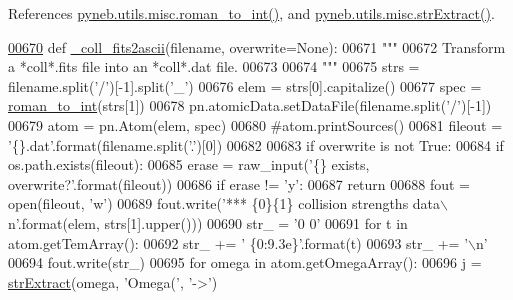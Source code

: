 References \hyperlink{misc_8py_source_l00053}{pyneb.\+utils.\+misc.\+roman\+\_\+to\+\_\+int()}, and \hyperlink{misc_8py_source_l00138}{pyneb.\+utils.\+misc.\+str\+Extract()}.


\begin{DoxyCode}
\hypertarget{namespacepyneb_1_1utils_1_1manage__atomic__data_l00670}{}\hyperlink{namespacepyneb_1_1utils_1_1manage__atomic__data_a1d70a5d8b876f114e058506cd9998de4}{00670} \textcolor{keyword}{def }\hyperlink{namespacepyneb_1_1utils_1_1manage__atomic__data_a1d70a5d8b876f114e058506cd9998de4}{\_coll\_fits2ascii}(filename, overwrite=None):
00671     \textcolor{stringliteral}{"""}
00672 \textcolor{stringliteral}{    Transform a *coll*.fits file into an *coll*.dat file.}
00673 \textcolor{stringliteral}{    }
00674 \textcolor{stringliteral}{    """}
00675     strs = filename.split(\textcolor{stringliteral}{'/'})[-1].split(\textcolor{stringliteral}{'\_'})
00676     elem = strs[0].capitalize()
00677     spec = \hyperlink{namespacepyneb_1_1utils_1_1misc_a97329c3ce57bd870421672b90e3e6541}{roman\_to\_int}(strs[1])
00678     pn.atomicData.setDataFile(filename.split(\textcolor{stringliteral}{'/'})[-1])
00679     atom = pn.Atom(elem, spec)
00680     \textcolor{comment}{#atom.printSources()}
00681     fileout = \textcolor{stringliteral}{'\{\}.dat'}.format(filename.split(\textcolor{stringliteral}{'.'})[0])
00682     
00683     \textcolor{keywordflow}{if} overwrite \textcolor{keywordflow}{is} \textcolor{keywordflow}{not} \textcolor{keyword}{True}:
00684         \textcolor{keywordflow}{if} os.path.exists(fileout):
00685             erase = raw\_input(\textcolor{stringliteral}{'\{\} exists, overwrite?'}.format(fileout))
00686             \textcolor{keywordflow}{if} erase != \textcolor{stringliteral}{'y'}:
00687                 \textcolor{keywordflow}{return}
00688     fout = open(fileout, \textcolor{stringliteral}{'w'})
00689     fout.write(\textcolor{stringliteral}{'*** \{0\}\{1\} collision strengths data\(\backslash\)n'}.format(elem, strs[1].upper()))
00690     str\_ = \textcolor{stringliteral}{'0 0'}
00691     \textcolor{keywordflow}{for} t \textcolor{keywordflow}{in} atom.getTemArray():
00692         str\_ += \textcolor{stringliteral}{' \{0:9.3e\}'}.format(t)
00693     str\_ += \textcolor{stringliteral}{'\(\backslash\)n'}
00694     fout.write(str\_)
00695     \textcolor{keywordflow}{for} omega \textcolor{keywordflow}{in} atom.getOmegaArray():
00696         j = \hyperlink{namespacepyneb_1_1utils_1_1misc_aaf9c5249e3c3104e38854ca30f9df4b7}{strExtract}(omega, \textcolor{stringliteral}{'Omega('}, \textcolor{stringliteral}{'->'})

\end{DoxyCode}
